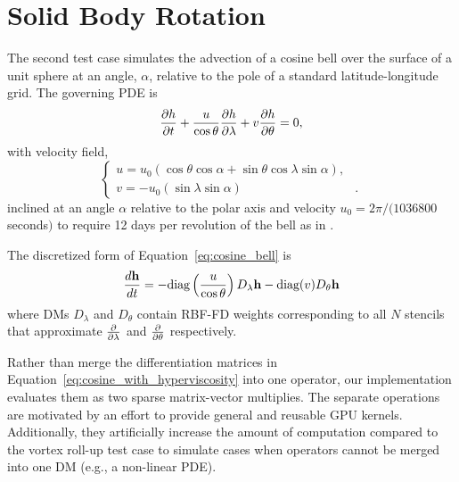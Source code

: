 \documentclass{report}
\begin{document}

\section{Solid Body Rotation}
\label{sec:cosine_bell}

The second test case simulates the advection of a cosine bell over the surface of a unit sphere at an angle, $\alpha$, relative to the pole of a standard latitude-longitude grid. The governing PDE is
\begin{equation}
\frac{\partial h}{\partial t} + \frac{u}{\cos \theta} \frac{\partial h}{\partial \lambda} + v \frac{\partial h}{\partial \theta} = 0, \label{eq:cosine_bell}
\end{equation}
with velocity field,
\begin{equation*}
\begin{cases}
u =  u_0 (\cos \theta \cos \alpha + \sin \theta \cos \lambda \sin \alpha),  & \\
v =  -u_0(\sin \lambda \sin \alpha) &.
\end{cases}
\end{equation*}
inclined at an angle $\alpha$ relative to the polar axis and velocity $u_0 = 2 \pi / (1036800$ seconds$)$ to require 12 days per revolution of the bell as in \cite{NairTransport05, FlyerWright07}.

The discretized form of Equation~\ref{eq:cosine_bell} is
\begin{equation}
\frac{d \mathbf{h}}{d t} = -\text{diag}\left(\frac{u}{\cos \theta}\right) D_\lambda \mathbf{h} - \text{diag}(v) D_\theta \mathbf{h}
\label{eq:cosine_with_hyperviscosity}
\end{equation}
where DMs $D_\lambda$ and $D_\theta$ contain RBF-FD weights corresponding to all $N$ stencils that approximate $\frac{\partial }{\partial \lambda}$ and $\frac{\partial }{\partial \theta}$ respectively. 

Rather than merge the differentiation matrices in Equation~\ref{eq:cosine_with_hyperviscosity} into one operator, our implementation evaluates them as two sparse matrix-vector multiplies. The separate operations are motivated by an effort to provide general and reusable GPU kernels. Additionally, they artificially increase the amount of computation compared to the vortex roll-up test case to simulate cases when operators cannot be merged into one DM (e.g., a non-linear PDE).
\end{document}

